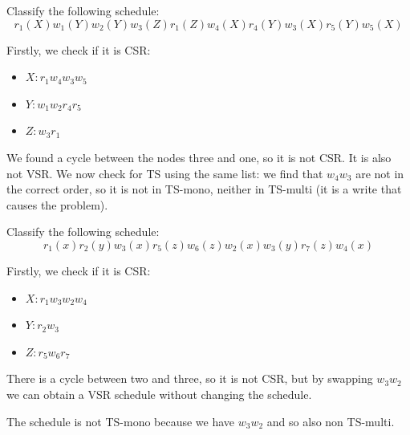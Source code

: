 \documentclass[12pt, a4paper]{report}
\newtheorem[style=M,bodystyle=\normalfont]{theorem}{Theorem}
\newtheorem[style=M,bodystyle=\normalfont]{corollary}{Corollary}
\newtheorem[style=M,bodystyle=\normalfont]{lemma}{Lemma}
\newtheorem[style=M,bodystyle=\normalfont]{definition}{Definition}
\begin{document}
\newpage

\begin{Exercise}[label=17]
    Classify the following schedule:
    \[r_1(X) w_1(Y) w_2(Y) w_3(Z) r_1(Z) w_4(X) r_4(Y) w_3(X) r_5(Y) w_5(X)\] 
\end{Exercise}
\begin{Answer}[ref=17]
    Firstly, we check if it is CSR:
    \begin{itemize}
        \item $X: r_1 w_4 w_3 w_5$
        \item $Y: w_1 w_2 r_4 r_5$
        \item $Z: w_3 r_1$
    \end{itemize}
    We found a cycle between the nodes three and one, so it is not CSR. It is also not VSR. We now check for TS using the same list: 
    we find that $w_4 w_3$ are not in the correct order, so it is not in TS-mono, neither in TS-multi (it is a write that causes the 
    problem).
\end{Answer}

\newpage

\begin{Exercise}[label=18]
    Classify the following schedule:
    \[r_1(x) r_2(y) w_3(x) r_5(z) w_6(z) w_2(x) w_3(y) r_7(z) w_4(x)\] 
\end{Exercise}
\begin{Answer}[ref=19]
    Firstly, we check if it is CSR:
    \begin{itemize}
        \item $X: r_1 w_3 w_2 w_4$
        \item $Y: r_2 w_3$
        \item $Z: r_5 w_6 r_7$
    \end{itemize}
    There is a cycle between two and three, so it is not CSR, but by swapping $w_3 w_2$ we can obtain a VSR schedule without changing the 
    schedule. 

    The schedule is not TS-mono because we have $w_3 w_2$ and so also non TS-multi. 
\end{Answer}

\newpage
\end{document}
